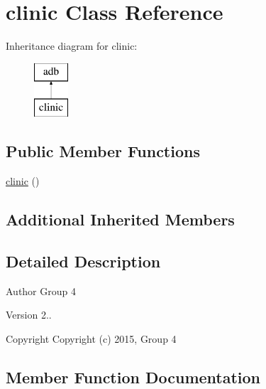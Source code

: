\hypertarget{classclinic}{}\section{clinic Class Reference}
\label{classclinic}
Inheritance diagram for clinic\+:\begin{figure}[H]
\begin{center}
\leavevmode
\includegraphics[height=2.000000cm]{classclinic}
\end{center}
\end{figure}
\subsection*{Public Member Functions}
\begin{DoxyCompactItemize}
\item 
\hyperlink{classclinic_a1d9ba914f550dea01f950757389ad385}{clinic} ()
\end{DoxyCompactItemize}
\subsection*{Additional Inherited Members}


\subsection{Detailed Description}
\begin{DoxyAuthor}{Author}
Group 4 
\end{DoxyAuthor}
\begin{DoxyVersion}{Version}
2.. 
\end{DoxyVersion}
\begin{DoxyCopyright}{Copyright}
Copyright (c) 2015, Group 4 
\end{DoxyCopyright}


\subsection{Member Function Documentation}
\hypertarget{classclinic_a1d9ba914f550dea01f950757389ad385}{}
